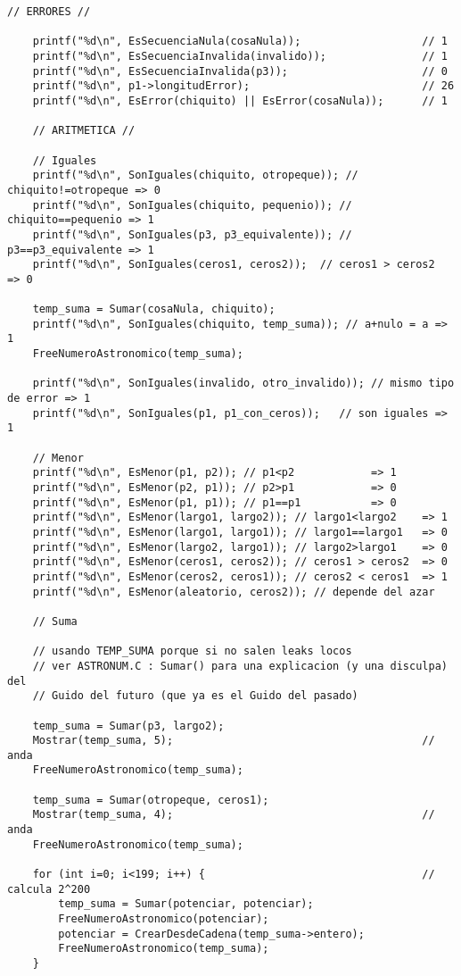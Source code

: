 \documentclass[a4paper, 12pt]{article}
\begin{document}
\begin{lstlisting}[style=C]
    // ERRORES //

    printf("%d\n", EsSecuenciaNula(cosaNula));                   // 1
    printf("%d\n", EsSecuenciaInvalida(invalido));               // 1
    printf("%d\n", EsSecuenciaInvalida(p3));                     // 0
    printf("%d\n", p1->longitudError);                           // 26
    printf("%d\n", EsError(chiquito) || EsError(cosaNula));      // 1

    // ARITMETICA //

    // Iguales
    printf("%d\n", SonIguales(chiquito, otropeque)); // chiquito!=otropeque => 0
    printf("%d\n", SonIguales(chiquito, pequenio)); // chiquito==pequenio => 1
    printf("%d\n", SonIguales(p3, p3_equivalente)); // p3==p3_equivalente => 1
    printf("%d\n", SonIguales(ceros1, ceros2));  // ceros1 > ceros2  => 0

    temp_suma = Sumar(cosaNula, chiquito);
    printf("%d\n", SonIguales(chiquito, temp_suma)); // a+nulo = a => 1
    FreeNumeroAstronomico(temp_suma);

    printf("%d\n", SonIguales(invalido, otro_invalido)); // mismo tipo de error => 1
    printf("%d\n", SonIguales(p1, p1_con_ceros));   // son iguales => 1

    // Menor
    printf("%d\n", EsMenor(p1, p2)); // p1<p2            => 1
    printf("%d\n", EsMenor(p2, p1)); // p2>p1            => 0
    printf("%d\n", EsMenor(p1, p1)); // p1==p1           => 0
    printf("%d\n", EsMenor(largo1, largo2)); // largo1<largo2    => 1
    printf("%d\n", EsMenor(largo1, largo1)); // largo1==largo1   => 0
    printf("%d\n", EsMenor(largo2, largo1)); // largo2>largo1    => 0
    printf("%d\n", EsMenor(ceros1, ceros2)); // ceros1 > ceros2  => 0
    printf("%d\n", EsMenor(ceros2, ceros1)); // ceros2 < ceros1  => 1
    printf("%d\n", EsMenor(aleatorio, ceros2)); // depende del azar

    // Suma

    // usando TEMP_SUMA porque si no salen leaks locos
    // ver ASTRONUM.C : Sumar() para una explicacion (y una disculpa) del
    // Guido del futuro (que ya es el Guido del pasado)

    temp_suma = Sumar(p3, largo2);
    Mostrar(temp_suma, 5);                                       // anda
    FreeNumeroAstronomico(temp_suma);
    
    temp_suma = Sumar(otropeque, ceros1);
    Mostrar(temp_suma, 4);                                       // anda
    FreeNumeroAstronomico(temp_suma);

    for (int i=0; i<199; i++) {                                  // calcula 2^200
        temp_suma = Sumar(potenciar, potenciar);
        FreeNumeroAstronomico(potenciar);
        potenciar = CrearDesdeCadena(temp_suma->entero);
        FreeNumeroAstronomico(temp_suma);
    }


\end{lstlisting}
\end{document}
